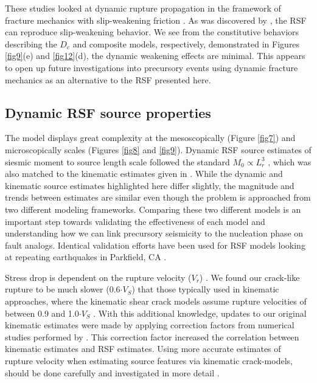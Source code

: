 \documentclass[preprint,1p, 10pt,authoryear]{elsarticle}
\begin{document}
These studies looked at dynamic rupture propagation in the framework of fracture mechanics with slip-weakening friction \citep{Ida1972,Andrews1976,Kammer2012,Kammer2015}.  As was discovered by \citet{Cocco2002}, the RSF can reproduce slip-weakening behavior. We see from the constitutive behaviors describing the $D_{c}$  and composite models, respectively, demonstrated in Figures \ref{fig9}(e) and \ref{fig12}(d), the dynamic weakening effects are minimal. This appears to open up future investigations into precursory events using dynamic fracture mechanics as an alternative to the RSF presented here.

\subsection{Dynamic RSF source properties}
The model displays great complexity at the mesoscopically (Figure \ref{fig7}) and microscopically scales (Figures \ref{fig8} and \ref{fig9}). Dynamic RSF source estimates of siesmic moment to source length scale followed the standard $M_{0} \propto L^{3}_{r}$ , which was also matched to the kinematic estimates given in \citet{Selvadurai2019}. While the dynamic and kinematic source estimates highlighted here differ slightly, the magnitude and trends between estimates are similar even though the problem is approached from two different modeling frameworks. Comparing these two different models is an important step towards validating the effectiveness of each model and understanding how we can link precursory seismicity to the nucleation phase on fault analogs. Identical validation efforts have been used for RSF models looking at repeating earthquakes in Parkfield, CA \citep{Chen2009}.

Stress drop is dependent on the rupture velocity ($V_{r}$) \citep{Kaneko2015}. We found our crack-like rupture to be much slower (0.6$\cdot V_{S}$) that those typically used in kinematic approaches, where the kinematic shear crack models assume rupture velocities of between 0.9 and 1.0$\cdot V_{S}$ \citep{Cocco2016, Selvadurai2019}. With this additional knowledge, updates to our original kinematic estimates were made by applying correction factors from numerical studies performed by \citet{Kaneko2015}. This correction factor increased the correlation between kinematic estimates and RSF estimates. Using more accurate estimates of rupture velocity when estimating source features via kinematic crack-models, should be done carefully and investigated in more detail \citep{McGuire2018}.
\end{document}
